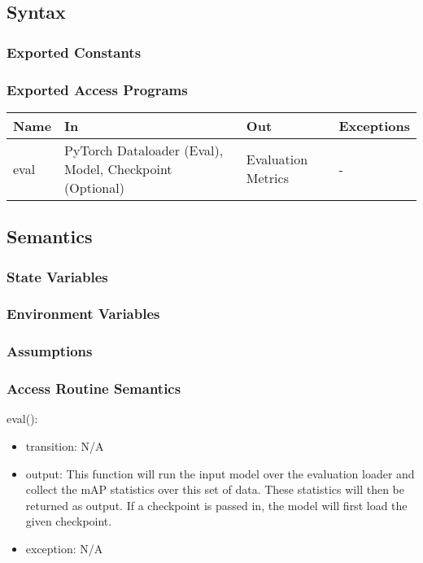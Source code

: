 \documentclass[12pt, titlepage]{article}
\begin{document}
\subsection{Syntax}



\subsubsection{Exported Constants}



\subsubsection{Exported Access Programs}

\begin{center}
  \begin{tabular}{p{2cm}|p{6cm}|p{2cm}|p{2cm}}
  \hline
  \textbf{Name} & \textbf{In} & \textbf{Out} & \textbf{Exceptions} \\
  \hline
  eval & PyTorch Dataloader (Eval), Model, Checkpoint (Optional) & Evaluation Metrics & - \\
  \hline
  \end{tabular}
\end{center}

\subsection{Semantics}

\subsubsection{State Variables}


\subsubsection{Environment Variables}


\subsubsection{Assumptions}



\subsubsection{Access Routine Semantics}
\noindent eval():
\begin{itemize}
\item transition: N/A 
\item output: This function will run the input model over the evaluation loader and collect the mAP statistics over this set of data. These statistics will then be returned as output. If a checkpoint is passed in, the model will first load the given checkpoint.
\item exception: N/A
\end{itemize}
\end{document}
